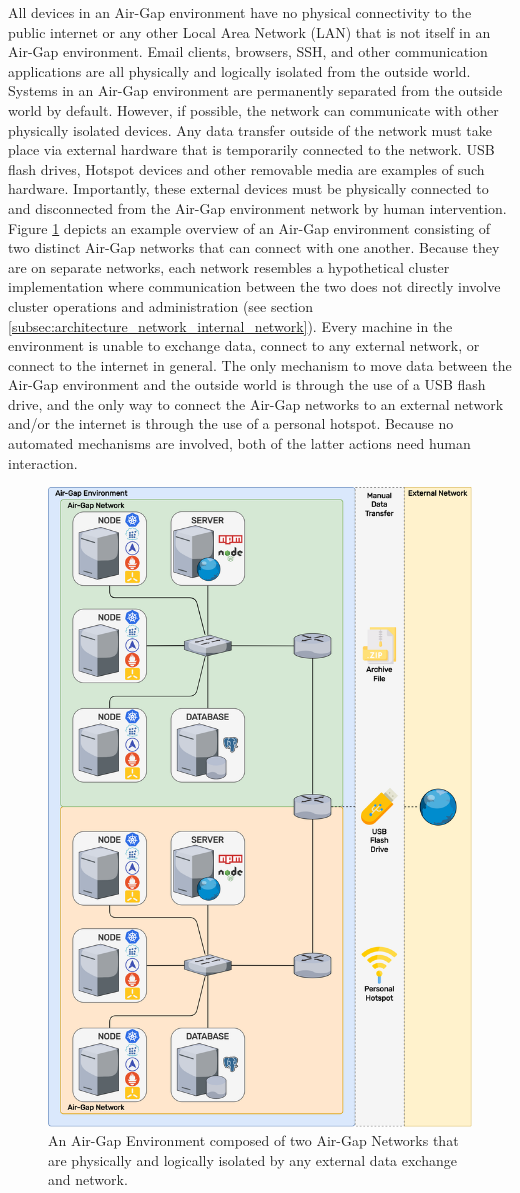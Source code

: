All devices in an Air-Gap environment have no physical connectivity to the public
internet or any other Local Area Network (LAN) that is not itself in an Air-Gap environment.
Email clients, browsers, SSH, and other communication applications are all physically
and logically isolated from the outside world. \\ %
Systems in an Air-Gap environment are permanently separated from the outside world
by default. However, if possible, the network can communicate with other
physically isolated devices. Any data transfer outside of the network must take place
via external hardware that is temporarily connected to the network. USB flash
drives, Hotspot devices and other removable media are examples of such hardware.
Importantly, these external devices must be physically connected to and disconnected
from the Air-Gap environment network by human intervention. \\ %
Figure \ref{fig:airgap} depicts an example overview of an Air-Gap environment consisting
of two distinct Air-Gap networks that can connect with one another. Because they
are on separate networks, each network resembles a hypothetical cluster implementation
where communication between the two does not directly involve cluster operations
and administration (see section
\ref{subsec:architecture_network_internal_network}). Every machine in the
environment is unable to exchange data, connect to any external network, or
connect to the internet in general. The only mechanism to move data between the Air-Gap
environment and the outside world is through the use of a USB flash drive, and
the only way to connect the Air-Gap networks to an external network and/or the
internet is through the use of a personal hotspot. Because no automated mechanisms
are involved, both of the latter actions need human interaction.

\begin{figure}
  \centering
  \includegraphics[width=.5\textwidth]{images/implementation/airgap.png}
  \caption{An
  Air-Gap
  Environment
  composed
  of
  two
  Air-Gap
  Networks
  that
  are
  physically
  and
  logically
  isolated
  by
  any
  external
  data
  exchange
  and
  network.}
  \label{fig:airgap}
\end{figure}


